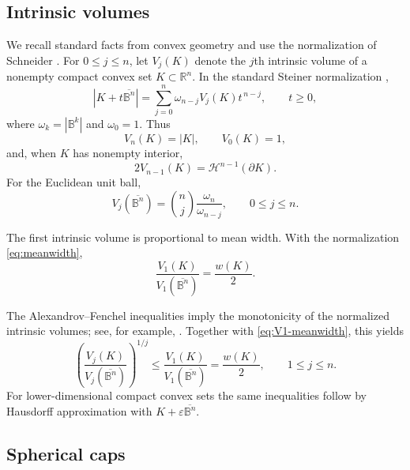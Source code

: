 \documentclass[11pt,reqno]{amsart}
\theoremstyle{remark}
\begin{document}
\subsection{Intrinsic volumes}

We recall standard facts from convex geometry and use the normalization of
Schneider \cite[Chapter~4]{Schneider}.  For $0\le j\le n$, let $V_j(K)$
denote the $j$th intrinsic volume of a nonempty compact convex set
$K\subset\mathbb R^n$.  In the standard Steiner normalization
\cite[Theorem~4.2.1]{Schneider},
\begin{equation}\label{eq:Steiner}
 |K+t\overline{\mathbb B^n}|
 =
 \sum_{j=0}^n
 \omega_{n-j}V_j(K)t^{\,n-j},
 \qquad t\ge0,
\end{equation}
where $\omega_k=|\mathbb B^k|$ and $\omega_0=1$.
Thus
\[
 V_n(K)=|K|,
 \qquad
 V_0(K)=1,
\]
and, when $K$ has nonempty interior,
\[
 2V_{n-1}(K)=\mathcal H^{n-1}(\partial K).
\]
For the Euclidean unit ball,
\begin{equation}\label{eq:intrinsic-ball}
 V_j(\overline{\mathbb B^n})
 =
 \binom{n}{j}\frac{\omega_n}{\omega_{n-j}},
 \qquad 0\le j\le n.
\end{equation}

The first intrinsic volume is proportional to mean width.  With the
normalization \eqref{eq:meanwidth},
\begin{equation}\label{eq:V1-meanwidth}
 \frac{V_1(K)}{V_1(\overline{\mathbb B^n})}
 =
 \frac{w(K)}2.
\end{equation}

The Alexandrov--Fenchel inequalities imply the monotonicity of the
normalized intrinsic volumes; see, for example,
\cite[Sections~7.3--7.4]{Schneider}.  Together with
\eqref{eq:V1-meanwidth}, this yields
\begin{equation}\label{eq:extended-Urysohn}
 \left(
 \frac{V_j(K)}{V_j(\overline{\mathbb B^n})}
 \right)^{1/j}
 \le
 \frac{V_1(K)}{V_1(\overline{\mathbb B^n})}
 =
 \frac{w(K)}2,
 \qquad 1\le j\le n.
\end{equation}
For lower-dimensional compact convex sets the same inequalities follow by
Hausdorff approximation with $K+\varepsilon\overline{\mathbb B^n}$.

\subsection{Spherical caps}
\end{document}
